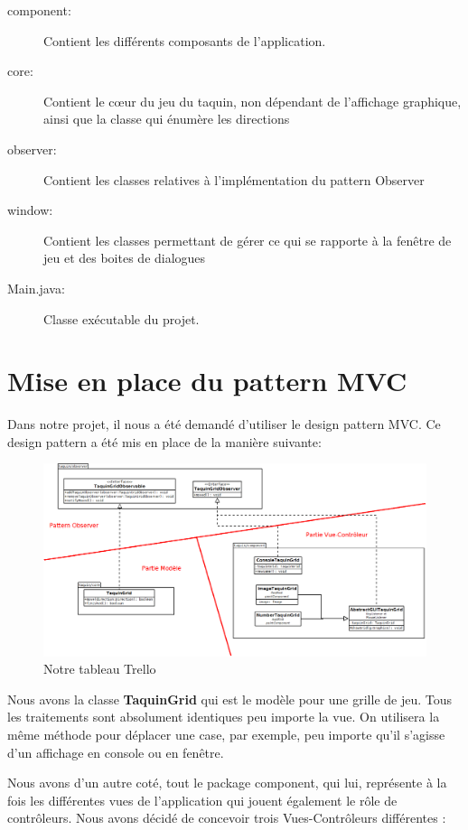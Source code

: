 		\begin{description}
			\item [component:] Contient les différents composants de l’application.
			\item [core:] Contient le cœur du jeu du taquin, non dépendant de l'affichage graphique, ainsi que la classe qui énumère les directions
			\item [observer:] Contient les classes relatives à l'implémentation du pattern Observer
			\item [window:] Contient les classes permettant de gérer ce qui se rapporte à la fenêtre de jeu et des boites de dialogues
			\item [Main.java:] Classe exécutable du projet.
		\end{description}

	\section{Mise en place du pattern MVC}

	Dans notre projet, il nous a été demandé d'utiliser le design pattern MVC. Ce design pattern a été mis en place de la manière suivante:

	\begin{figure}[H]
		\centering\includegraphics[width=1\textwidth, keepaspectratio]{img/diagramMVC.png}
		\caption{Notre tableau Trello}
		\label{Mise en place du M-VC}
	\end{figure}

	Nous avons la classe \textbf{TaquinGrid} qui est le modèle pour une grille de jeu. Tous les traitements sont absolument identiques peu importe la vue. On utilisera la même méthode pour déplacer une case, par exemple, peu importe qu'il s'agisse d'un affichage en console ou en fenêtre.

	Nous avons d'un autre coté, tout le package component, qui lui, représente à la fois les différentes vues de l'application qui jouent également le rôle de contrôleurs. Nous avons décidé de concevoir trois Vues-Contrôleurs différentes :

